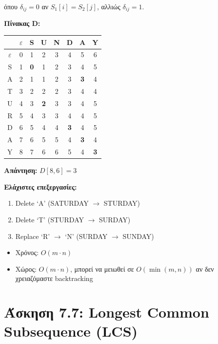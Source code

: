 όπου $\delta_{ij} = 0$ αν $S_1[i] = S_2[j]$, αλλιώς $\delta_{ij} = 1$.

\textbf{Πίνακας D:}

\begin{center}
\small
\begin{tabular}{c|ccccccc}
 & $\varepsilon$ & S & U & N & D & A & Y \\
\hline
$\varepsilon$ & 0 & 1 & 2 & 3 & 4 & 5 & 6 \\
S & 1 & \textbf{0} & 1 & 2 & 3 & 4 & 5 \\
A & 2 & 1 & 1 & 2 & 3 & \textbf{3} & 4 \\
T & 3 & 2 & 2 & 2 & 3 & 4 & 4 \\
U & 4 & 3 & \textbf{2} & 3 & 3 & 4 & 5 \\
R & 5 & 4 & 3 & 3 & 4 & 4 & 5 \\
D & 6 & 5 & 4 & 4 & \textbf{3} & 4 & 5 \\
A & 7 & 6 & 5 & 5 & 4 & \textbf{3} & 4 \\
Y & 8 & 7 & 6 & 6 & 5 & 4 & \textbf{3} \\
\end{tabular}
\end{center}

\textbf{Απάντηση:} $D[8,6] = 3$

\textbf{Ελάχιστες επεξεργασίες:}
\begin{enumerate}
    \item Delete `A' (SATURDAY $\to$ STURDAY)
    \item Delete `T' (STURDAY $\to$ SURDAY)
    \item Replace `R' $\to$ `N' (SURDAY $\to$ SUNDAY)
\end{enumerate}

\begin{infobox}[Πολυπλοκότητα]
\begin{itemize}
    \item Χρόνος: $O(m \cdot n)$
    \item Χώρος: $O(m \cdot n)$, μπορεί να μειωθεί σε $O(\min(m,n))$ αν δεν χρειαζόμαστε backtracking
\end{itemize}
\end{infobox}

\section{Άσκηση 7.7: Longest Common Subsequence (LCS)}

